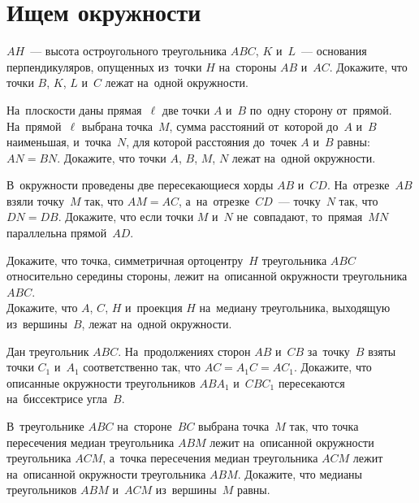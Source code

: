 
\section*{Ищем окружности}


\begin{problems}

\item
$AH$~--- высота остроугольного треугольника $ABC$, $K$ и~$L$~--- основания
перпендикуляров, опущенных из~точки $H$ на~стороны $AB$ и~$AC$.
Докажите, что точки $B$, $K$, $L$ и~$C$ лежат на~одной окружности.

\item
На~плоскости даны прямая~$\ell$ две точки $A$ и~$B$ по~одну сторону от~прямой.
На~прямой~$\ell$ выбрана точка~$M$, сумма расстояний от~которой до~$A$ и~$B$
наименьшая, и~точка~$N$, для которой расстояния до~точек $A$ и~$B$ равны:
$AN = BN$.
Докажите, что точки $A$, $B$, $M$, $N$ лежат на~одной окружности.

\item
В~окружности проведены две пересекающиеся хорды $AB$ и~$CD$.
На~отрезке~$AB$ взяли точку~$M$ так, что $AM = AC$, а~на~отрезке~$CD$~---
точку~$N$ так, что $DN = DB$.
Докажите, что если точки $M$ и~$N$ не~совпадают, то~прямая~$MN$ параллельна
прямой~$AD$.

\item
\subproblem
Докажите, что точка, симметричная ортоцентру~$H$ треугольника $ABC$
относительно середины стороны, лежит на~описанной окружности
треугольника $ABC$.
\\
\subproblem
Докажите, что $A$, $C$, $H$ и~проекция $H$ на~медиану треугольника, выходящую
из~вершины~$B$, лежат на~одной окружности.

\item
Дан треугольник $ABC$.
На~продолжениях сторон $AB$ и~$CB$ за~точку~$B$ взяты точки $C_1$ и~$A_1$
соответственно так, что $AC = A_1 C = A C_1$.
Докажите, что описанные окружности треугольников $A B A_1$ и~$C B C_1$
пересекаются на~биссектрисе угла~$B$.

\item
В~треугольнике $ABC$ на~стороне~$BC$ выбрана точка~$M$ так, что точка
пересечения медиан треугольника $ABM$ лежит на~описанной окружности
треугольника $ACM$, а~точка пересечения медиан треугольника $ACM$ лежит
на~описанной окружности треугольника $ABM$.
Докажите, что медианы треугольников $ABM$ и~$ACM$ из~вершины~$M$ равны.

\end{problems}

